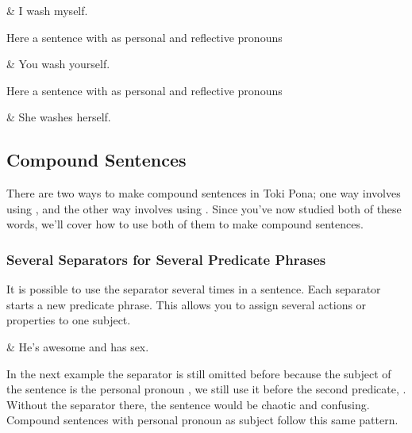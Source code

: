 \begin{translationtable}
     & I wash myself. \\
\end{translationtable}
%
Here a sentence with  as personal and reflective pronouns

\begin{translationtable}
     & You wash yourself. \\
\end{translationtable}
%
Here a sentence with  as personal and reflective pronouns

\begin{translationtable}
     & She washes herself. \\
\end{translationtable}
%
\subsection*{Compound Sentences}
There are two ways to make compound sentences in Toki Pona; one way involves using , and the other way involves using .
Since you've now studied both of these words, we'll cover how to use both of them to make compound sentences.

\subsubsection*{Several  Separators for Several Predicate Phrases}
\label{sssec:multiple_li}
It is possible to use the separator  several times in a sentence.
Each separator  starts a new predicate phrase.
This allows you to assign several actions or properties to one subject.

\begin{translationtable}
     & He's awesome and has sex. \\
\end{translationtable}
%
In the next example the separator  is still omitted before  because the subject of the sentence is the personal pronoun , we still use it before the second predicate, .
Without the separator  there, the sentence would be chaotic and confusing.
Compound sentences with personal pronoun  as subject follow this same pattern.

